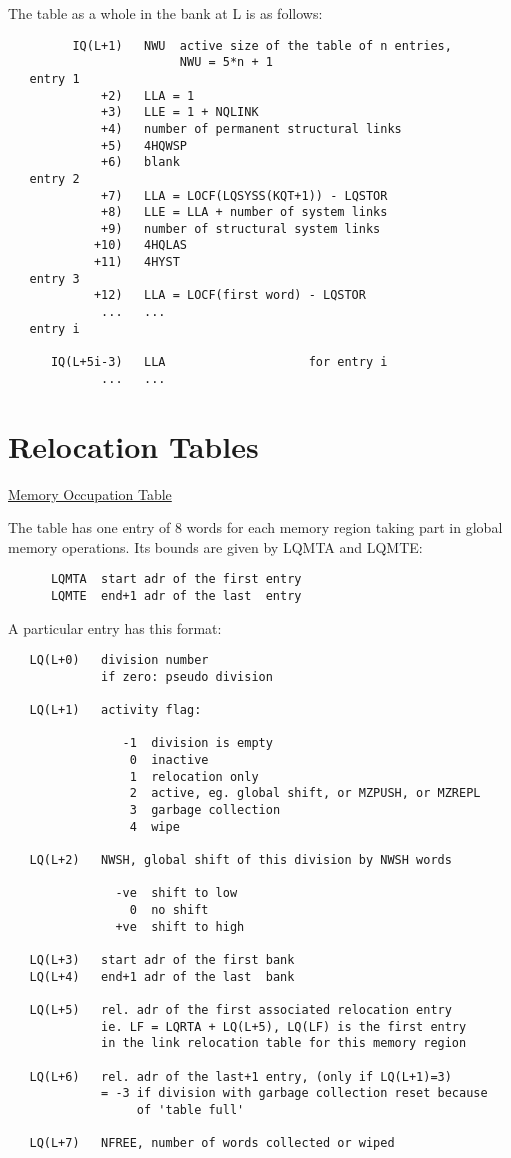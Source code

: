 The table as a whole in the bank at L is as follows:

\begin{verbatim}
         IQ(L+1)   NWU  active size of the table of n entries,
                        NWU = 5*n + 1
   entry 1
             +2)   LLA = 1
             +3)   LLE = 1 + NQLINK
             +4)   number of permanent structural links
             +5)   4HQWSP
             +6)   blank
   entry 2
             +7)   LLA = LOCF(LQSYSS(KQT+1)) - LQSTOR
             +8)   LLE = LLA + number of system links
             +9)   number of structural system links
            +10)   4HQLAS
            +11)   4HYST
   entry 3
            +12)   LLA = LOCF(first word) - LQSTOR
             ...   ...
   entry i

      IQ(L+5i-3)   LLA                    for entry i
             ...   ...
\end{verbatim} 

\section{Relocation Tables}

\begin{flushright} \ul{\large Memory Occupation Table}
\end{flushright}

The table has one entry of 8 words for each memory region
taking part in global memory operations.
Its bounds are given by LQMTA and LQMTE:

\begin{verbatim}
      LQMTA  start adr of the first entry
      LQMTE  end+1 adr of the last  entry
\end{verbatim} 

A particular entry has this format:

\begin{verbatim}
   LQ(L+0)   division number
             if zero: pseudo division

   LQ(L+1)   activity flag:

                -1  division is empty
                 0  inactive
                 1  relocation only
                 2  active, eg. global shift, or MZPUSH, or MZREPL
                 3  garbage collection
                 4  wipe

   LQ(L+2)   NWSH, global shift of this division by NWSH words

               -ve  shift to low
                 0  no shift
               +ve  shift to high

   LQ(L+3)   start adr of the first bank
   LQ(L+4)   end+1 adr of the last  bank

   LQ(L+5)   rel. adr of the first associated relocation entry
             ie. LF = LQRTA + LQ(L+5), LQ(LF) is the first entry
             in the link relocation table for this memory region

   LQ(L+6)   rel. adr of the last+1 entry, (only if LQ(L+1)=3)
             = -3 if division with garbage collection reset because
                  of 'table full'

   LQ(L+7)   NFREE, number of words collected or wiped
\end{verbatim} 

